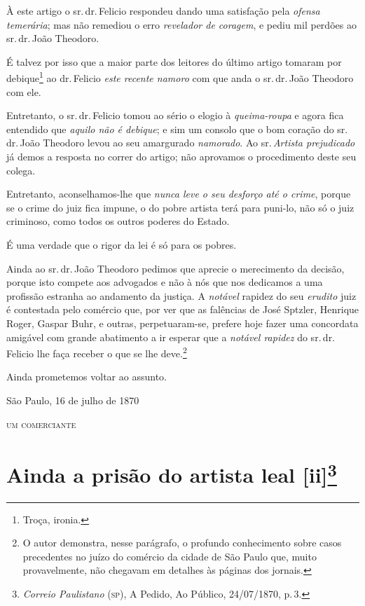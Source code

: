 À este artigo o sr.\,dr.\,Felicio respondeu dando uma satisfação pela
\emph{ofensa temerária}; mas não remediou o erro \emph{revelador de
coragem}, e pediu mil perdões ao sr.\,dr.\,João Theodoro.

É talvez por isso que a maior parte dos leitores do último artigo
tomaram por debique\footnote{ Troça, ironia.} ao dr.\,Felicio \emph{este
recente namoro} com que anda o sr.\,dr.\,João Theodoro com ele.

Entretanto, o sr.\,dr.\,Felicio tomou ao sério o elogio à
\emph{queima-roupa} e agora fica entendido que \emph{aquilo não é
debique}; e sim um consolo que o bom coração do sr.\,dr.\,João Theodoro
levou ao seu amargurado \emph{namorado}. Ao sr.\,\emph{Artista
prejudicado} já demos a resposta no correr do artigo; não aprovamos o
procedimento deste seu colega.

Entretanto, aconselhamos-lhe que \emph{nunca leve o seu desforço até o
crime}, porque se o crime do juiz fica impune, o do pobre artista terá
para puni-lo, não só o juiz criminoso, como todos os outros poderes do
Estado.

É uma verdade que o rigor da lei é só para os pobres.

Ainda ao sr.\,dr.\,João Theodoro pedimos que aprecie o merecimento da
decisão, porque isto compete aos advogados e não à nós que nos dedicamos
a uma profissão estranha ao andamento da justiça. A \emph{notável}
rapidez do seu \emph{erudito} juiz é contestada pelo comércio que, por
ver que as falências de José Sptzler, Henrique Roger, Gaspar Buhr, e
outras, perpetuaram-se, prefere hoje fazer uma concordata amigável com
grande abatimento a ir esperar que a \emph{notável rapidez} do sr.\,dr.\,Felicio lhe faça receber o que se lhe deve.\footnote{ O autor
  demonstra, nesse parágrafo, o profundo conhecimento sobre casos
  precedentes no juízo do comércio da cidade de São Paulo que, muito
  provavelmente, não chegavam em detalhes às páginas dos jornais.}

Ainda prometemos voltar ao assunto.

\begin{flushright}
São Paulo, 16 de julho de 1870

\textsc{um comerciante}
\end{flushright}

\chapter{Ainda a prisão do artista leal {[}ii{]}\footnote{\emph{Correio Paulistano} (\textsc{sp}), A Pedido, Ao Público,
  24/07/1870, p.\,3.}} %


